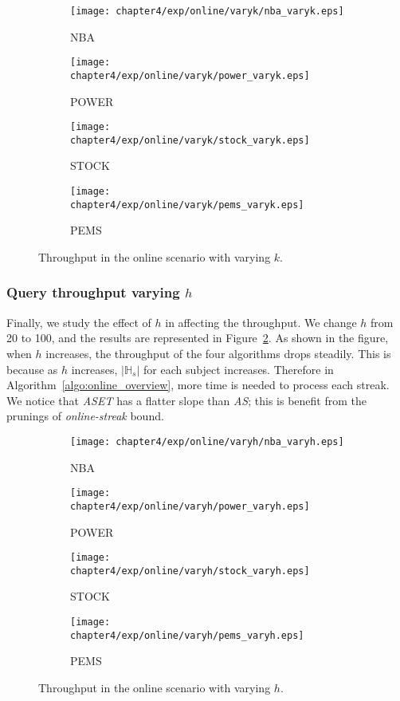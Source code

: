 \begin{figure}[t]
\centering
    \begin{subfigure}[b]{0.45\textwidth}
        \texttt{[image: chapter4/exp/online/varyk/nba\_varyk.eps]}
        \caption{NBA}
    \end{subfigure}
    \begin{subfigure}[b]{0.45\textwidth}
        \texttt{[image: chapter4/exp/online/varyk/power\_varyk.eps]}
        \caption{POWER}
    \end{subfigure}
    \begin{subfigure}[b]{0.45\textwidth}
        \texttt{[image: chapter4/exp/online/varyk/stock\_varyk.eps]}
        \caption{STOCK}
    \end{subfigure}
    \begin{subfigure}[b]{0.45\textwidth}
        \texttt{[image: chapter4/exp/online/varyk/pems\_varyk.eps]}
        \caption{PEMS}
    \end{subfigure}
\caption{Throughput in the online scenario with varying $k$.}
\label{exp:online_mining_vary_k}
\end{figure}

\subsubsection{Query throughput varying $h$}
Finally, we study the effect of $h$ in affecting the throughput.
We change $h$ from 20 to 100, and the results are represented in Figure~\ref{exp:online_mining_vary_h}.
As shown in the figure, when $h$ increases, 
the throughput of the four algorithms drops steadily.
This is because as $h$ increases, $|\mathbb{H}_s|$ for each subject
increases. Therefore in Algorithm~\ref{algo:online_overview}, more time is needed 
to process each streak. We notice that \emph{ASET} has a flatter slope than \emph{AS}; this
is benefit from the prunings of \emph{online-streak} bound.
\begin{figure}[h]
\centering
    \begin{subfigure}[b]{0.45\textwidth}
        \texttt{[image: chapter4/exp/online/varyh/nba\_varyh.eps]}
        \caption{NBA}
    \end{subfigure}
    \begin{subfigure}[b]{0.45\textwidth}
        \texttt{[image: chapter4/exp/online/varyh/power\_varyh.eps]}
        \caption{POWER}
    \end{subfigure}
    \begin{subfigure}[b]{0.45\textwidth}
        \texttt{[image: chapter4/exp/online/varyh/stock\_varyh.eps]}
        \caption{STOCK}
    \end{subfigure}
    \begin{subfigure}[b]{0.45\textwidth}
        \texttt{[image: chapter4/exp/online/varyh/pems\_varyh.eps]}
        \caption{PEMS}
    \end{subfigure}
\caption{Throughput in the online scenario with varying $h$.}
\label{exp:online_mining_vary_h}
\end{figure}

